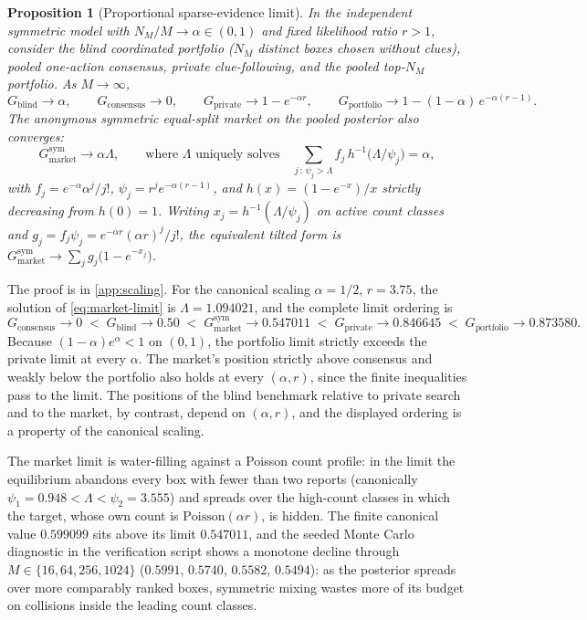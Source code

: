 \documentclass[11pt]{article}
\newtheorem{proposition}{Proposition}
\theoremstyle{definition}
\theoremstyle{remark}
\newcommand{\1}{\mathbf{1}}
\newcommand{\priv}{\mathrm{private}}
\newcommand{\cons}{\mathrm{consensus}}
\newcommand{\mkt}{\mathrm{market}}
\begin{document}
\begin{proposition}[Proportional sparse-evidence limit]
\label{prop:scaling}
In the independent symmetric model with $N_M/M\to\alpha\in(0,1)$ and fixed likelihood ratio $r>1$, consider the blind coordinated portfolio ($N_M$ distinct boxes chosen without clues), pooled one-action consensus, private clue-following, and the pooled top-$N_M$ portfolio. As $M\to\infty$,
\[
G_{\mathrm{blind}}\longrightarrow\alpha,
\qquad
G_{\cons}\longrightarrow 0,
\qquad
G_{\priv}\longrightarrow 1-e^{-\alpha r},
\qquad
G_{\mathrm{portfolio}}\longrightarrow 1-(1-\alpha)\,e^{-\alpha(r-1)}.
\]
The anonymous symmetric equal-split market on the pooled posterior also converges:
\begin{equation}
G_{\mkt}^{\mathrm{sym}}\longrightarrow \alpha\Lambda,
\qquad
\text{where $\Lambda$ uniquely solves}
\quad
\sum_{j\,:\,\psi_j>\Lambda} f_j\,h^{-1}\!\bigl(\Lambda/\psi_j\bigr)=\alpha,
\label{eq:market-limit}
\end{equation}
with $f_j=e^{-\alpha}\alpha^{j}/j!$, $\psi_j=r^{j}e^{-\alpha(r-1)}$, and $h(x)=(1-e^{-x})/x$ strictly decreasing from $h(0)=1$. Writing $x_j=h^{-1}(\Lambda/\psi_j)$ on active count classes and $g_j=f_j\psi_j=e^{-\alpha r}(\alpha r)^{j}/j!$, the equivalent tilted form is $G_{\mkt}^{\mathrm{sym}}\to\sum_j g_j\bigl(1-e^{-x_j}\bigr)$.
\end{proposition}

The proof is in \cref{app:scaling}. For the canonical scaling $\alpha=1/2$, $r=3.75$, the solution of \cref{eq:market-limit} is $\Lambda=1.094021$, and the complete limit ordering is
\[
G_{\cons}\to 0
\;<\;
G_{\mathrm{blind}}\to 0.50
\;<\;
G_{\mkt}^{\mathrm{sym}}\to 0.547011
\;<\;
G_{\priv}\to 0.846645
\;<\;
G_{\mathrm{portfolio}}\to 0.873580.
\]
Because $(1-\alpha)e^{\alpha}<1$ on $(0,1)$, the portfolio limit strictly exceeds the private limit at every $\alpha$. The market's position strictly above consensus and weakly below the portfolio also holds at every $(\alpha,r)$, since the finite inequalities pass to the limit. The positions of the blind benchmark relative to private search and to the market, by contrast, depend on $(\alpha,r)$, and the displayed ordering is a property of the canonical scaling.

The market limit is water-filling against a Poisson count profile: in the limit the equilibrium abandons every box with fewer than two reports (canonically $\psi_1=0.948<\Lambda<\psi_2=3.555$) and spreads over the high-count classes in which the target, whose own count is $\mathrm{Poisson}(\alpha r)$, is hidden. The finite canonical value $0.599099$ sits above its limit $0.547011$, and the seeded Monte Carlo diagnostic in the verification script shows a monotone decline through $M\in\{16,64,256,1024\}$ ($0.5991$, $0.5740$, $0.5582$, $0.5494$): as the posterior spreads over more comparably ranked boxes, symmetric mixing wastes more of its budget on collisions inside the leading count classes.
\end{document}
